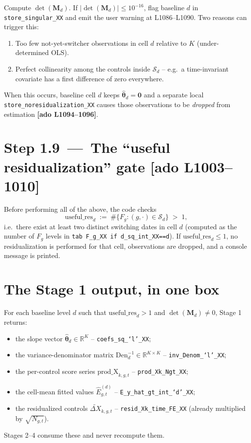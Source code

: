 \documentclass[11pt]{article}
\newcommand{\code}[1]{\texttt{\small #1}}
\newcommand{\Adoref}[1]{\textcolor{accent}{\footnotesize\textbf{[ado L#1]}}}
\newcommand{\R}{\mathbb{R}}
\newcommand{\1}{\mathbb{1}}
\newcommand{\Smpl}{\mathcal{S}}
\newcommand{\thetad}{\widehat{\bm{\theta}}_d}
\newcommand{\Ngt}{N_{g,t}}
\begin{document}
Compute $\det(\bm{M}_d)$. If $\lvert\det(\bm{M}_d)\rvert \le 10^{-16}$, flag
baseline $d$ in \code{store\_singular\_XX} and emit the user warning at
L1086--L1090. Two reasons can trigger this:
\begin{enumerate}[leftmargin=*]
\item Too few not-yet-switcher observations in cell $d$ relative to $K$
(under-determined OLS).
\item Perfect collinearity among the controls inside $\Smpl_d$ -- e.g.\ a
time-invariant covariate has a first difference of zero everywhere.
\end{enumerate}
When this occurs, baseline cell $d$ keeps $\thetad = \bm{0}$ and a separate
local \code{store\_noresidualization\_XX} causes those observations to be
\emph{dropped} from estimation \Adoref{1094--1096}.

\section[Step 1.9 -- The ``useful residualization'' gate (L1003--1010)]{Step 1.9 \,---\, The ``useful residualization'' gate \Adoref{1003--1010}}

Before performing all of the above, the code checks
\begin{equation}
\mathrm{useful\_res}_d \;:=\; \#\{F_g : (g,\cdot)\in\Smpl_d\} \;>\; 1,
\label{eq:useful}
\end{equation}
i.e.\ there exist at least two distinct switching dates in cell $d$ (computed
as the number of $F_g$ levels in \code{tab F\_g\_XX if d\_sq\_int\_XX==d}).
If $\mathrm{useful\_res}_d \le 1$, no residualization is performed for that
cell, observations are dropped, and a console message is printed.

\section{The Stage 1 output, in one box}

\begin{tcolorbox}[colback=codebg, colframe=navy, boxrule=0.6pt, arc=1pt]
For each baseline level $d$ such that
$\mathrm{useful\_res}_d > 1$ and $\det(\bm{M}_d)\ne 0$, Stage 1 returns:
\begin{itemize}[leftmargin=*, itemsep=2pt]
  \item the slope vector $\thetad \in \R^K$ -- \code{coefs\_sq\_`l'\_XX};
  \item the variance-denominator matrix $\mathrm{Den}_d^{-1} \in \R^{K\times K}$ -- \code{inv\_Denom\_`l'\_XX};
  \item the per-control score series $\mathrm{prod\_X}_{k,g,t}$ -- \code{prod\_X{k}\_Ngt\_XX};
  \item the cell-mean fitted values $\widehat{E}_{g,t}^{(d)}$ -- \code{E\_y\_hat\_gt\_int\_`d'\_XX};
  \item the residualized controls $\widetilde{\Delta X}_{k,g,t}$ -- \code{resid\_X{k}\_time\_FE\_XX} (already multiplied by $\sqrt{\Ngt}$).
\end{itemize}
Stages 2--4 consume these and never recompute them.
\end{tcolorbox}
\end{document}
